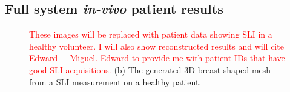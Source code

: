 \subsection{Full system \textit{in-vivo} patient results}
\begin{figure}[]
    \begin{center}
    \end{center}
    \caption{\textcolor{red}{These images will be replaced with patient data showing SLI in a healthy volunteer. I will also show reconstructed results and will cite Edward + Miguel. Edward to provide me with patient IDs that have good SLI acquisitions. } (b) The generated 3D breast-shaped mesh from a \ac{SLI} measurement on a healthy patient.} 
    \label{fig:PatientResults}
\end{figure} 

